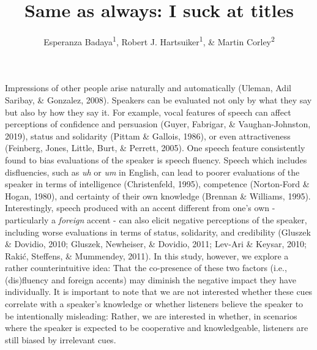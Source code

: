 \documentclass[
  man,floatsintext]{apa7}
\title{Same as always: I suck at titles}
\author{Esperanza Badaya\textsuperscript{1}, Robert J. Hartsuiker\textsuperscript{1}, \& Martin Corley\textsuperscript{2}}
\date{}
\affiliation{\vspace{0.5cm}\textsuperscript{1} Ghent University\\\textsuperscript{2} University of Edinburgh}
\begin{document}
\maketitle

Impressions of other people arise naturally and automatically (Uleman, Adil Saribay, \& Gonzalez, 2008). Speakers can be evaluated not only by what they say but also by how they say it. For example, vocal features of speech can affect perceptions of confidence and persuasion (Guyer, Fabrigar, \& Vaughan-Johnston, 2019), status and solidarity (Pittam \& Gallois, 1986), or even attractiveness (Feinberg, Jones, Little, Burt, \& Perrett, 2005). One speech feature consistently found to bias evaluations of the speaker is speech fluency. Speech which includes disfluencies, such as \emph{uh} or \emph{um} in English, can lead to poorer evaluations of the speaker in terms of intelligence (Christenfeld, 1995), competence (Norton-Ford \& Hogan, 1980), and certainty of their own knowledge (Brennan \& Williams, 1995). Interestingly, speech produced with an accent different from one's own - particularly a \emph{foreign} accent - can also elicit negative perceptions of the speaker, including worse evaluations in terms of status, solidarity, and credibility (Gluszek \& Dovidio, 2010; Gluszek, Newheiser, \& Dovidio, 2011; Lev-Ari \& Keysar, 2010; Rakić, Steffens, \& Mummendey, 2011). In this study, however, we explore a rather counterintuitive idea: That the co-presence of these two factors (i.e., (dis)fluency and foreign accents) may diminish the negative impact they have individually. It is important to note that we are not interested whether these cues correlate with a speaker's knowledge or whether listeners believe the speaker to be intentionally misleading: Rather, we are interested in whether, in scenarios where the speaker is expected to be cooperative and knowledgeable, listeners are still biased by irrelevant cues.
\end{document}

